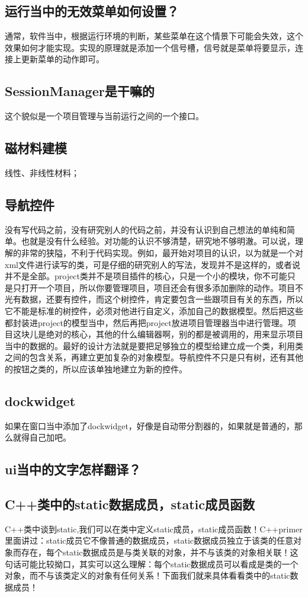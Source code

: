 \subsection{运行当中的无效菜单如何设置？}
通常，软件当中，根据运行环境的判断，某些菜单在这个情景下可能会失效，这个效果如何才能实现。实现的原理就是添加一个信号槽，信号就是菜单将要显示，连接上更新菜单的动作即可。
\subsection{SessionManager是干嘛的}
这个貌似是一个项目管理与当前运行之间的一个接口。
\subsection{磁材料建模}
线性、非线性材料；
\subsection{导航控件}
没有写代码之前，没有研究别人的代码之前，并没有认识到自己想法的单纯和简单。也就是没有什么经验。对功能的认识不够清楚，研究地不够明澈。可以说，理解的非常的狭隘，不利于代码实现。例如，最开始对项目的认识，以为就是一个对xml文件进行读写的类，可是仔细的研究别人的写法，发现并不是这样的，或者说并不是全部。project类并不是项目插件的核心，只是一个小的模块，你不可能只是只打开一个项目，所以你要管理项目，项目还会有很多添加删除的动作。项目不光有数据，还要有控件，而这个树控件，肯定要包含一些跟项目有关的东西，所以它不能是标准的树控件，必须对他进行自定义，添加自己的数据模型。然后把这些都封装进project的模型当中，然后再把project放进项目管理器当中进行管理。项目这块儿是绝对的核心，其他的什么编辑器啊，别的都是被调用的，用来显示项目当中的数据的。最好的设计方法就是要把足够独立的模型给建立成一个类，利用类之间的包含关系，再建立更加复杂的对象模型。导航控件不只是只有树，还有其他的按钮之类的，所以应该单独地建立为新的控件。
\subsection{dockwidget}
如果在窗口当中添加了dockwidget，好像是自动带分割器的，如果就是普通的，那么就得自己加吧。
\subsection{ui当中的文字怎样翻译？}

\subsection{C++类中的static数据成员，static成员函数}
C++类中谈到static,我们可以在类中定义static成员，static成员函数！C++primer里面讲过：static成员它不像普通的数据成员，static数据成员独立于该类的任意对象而存在，每个static数据成员是与类关联的对象，并不与该类的对象相关联！这句话可能比较拗口，其实可以这么理解：每个static数据成员可以看成是类的一个对象，而不与该类定义的对象有任何关系！下面我们就来具体看看类中的static数据成员！

